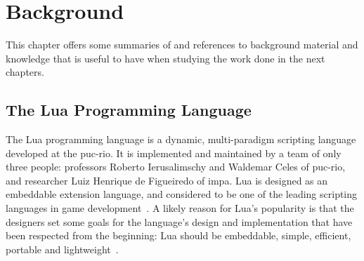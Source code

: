 \chapter{Background}
\label{ch:background}
This chapter offers some summaries of and references to background material and knowledge that is useful to have when studying the work done in the next chapters. 

\section{The Lua Programming Language}
\label{sec:lua_language}

The Lua programming language is a dynamic, multi-paradigm scripting language developed at the \gls{puc-rio}. It is implemented and maintained by a team of only three people: professors Roberto Ierusalimschy and Waldemar Celes of \gls{puc-rio}, and researcher Luiz Henrique de Figueiredo of \gls{impa}. Lua is designed as an embeddable extension language, and considered to be one of the leading scripting languages in game development~\cite{inproceedings:the_evolution_of_lua}. A likely reason for Lua's popularity is that the designers set some goals for the language's design and implementation that have been respected from the beginning: Lua should be embeddable, simple, efficient, portable and lightweight~\cite{article:the_implementation_of_lua}.

